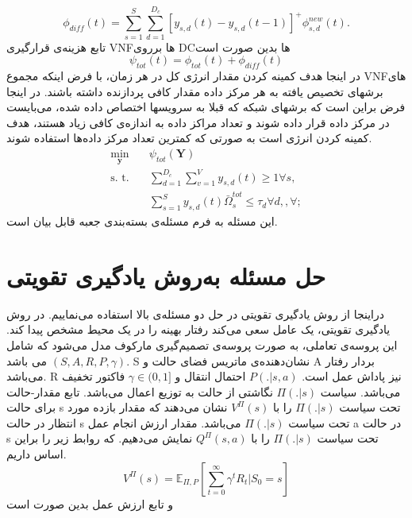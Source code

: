 \begin{equation*}
	\textstyle \phi_{diff}(t) = \sum_{s=1}^{S}\sum_{d=1}^{D_c}[y_{s,d}(t)-y_{s,d}(t-1)]^+\phi_{s,d}^{new}(t).
\end{equation*}
تابع هزینه‌ی قرارگیری VNFها برروی DCها بدین صورت است
\begin{equation}\label{eqpsi}
	\textstyle  \psi_{tot}(t) = \phi_{tot}(t) + \phi_{diff}(t)
\end{equation}
در اینجا هدف کمینه کردن مقدار انرژی کل در هر زمان، با فرض اینکه مجموع VNFهای برشهای تخصیص یافته به هر مرکز داده مقدار کافی پردازنده داشته باشند. در اینجا فرض براین است که برشهای شبکه که قبلا به سرویسها اختصاص داده شده، می‌بایست در مرکز داده قرار داده شوند و تعداد مراکز داده به اندازه‌ی کافی زیاد هستند، هدف کمینه کردن انرژی است به صورتی که کمترین تعداد مرکز داده‌ها استفاده شوند.
\begin{subequations}
	\begin{alignat}{4}
		\min\limits_{\boldsymbol{y} }   \quad &   \psi_{tot}(\boldsymbol{Y})\\
		\text{s. t.} \quad & \textstyle \sum_{d=1}^{D_c}\sum_{v=1}^{V}y_{s,d}(t) \geq 1 \forall s, \\
		&\textstyle  \sum_{s=1}^{S} y_{s,d}(t) \bar{\Omega}_{s}^{tot}  \leq   \tau_{d}  \forall d,, \forall ;  \label{eqomega}
	\end{alignat}
\end{subequations}
این مسئله به فرم مسئله‌ی بسته‌بندی جعبه قابل بیان است.
\section{حل مسئله به‌روش یادگیری تقویتی}
دراینجا از روش یادگیری تقویتی در حل دو مسئله‌ی بالا استفاده می‌نماییم.
در روش یادگیری تقویتی، یک عامل سعی می‌کند رفتار بهینه را در یک محیط مشخص پیدا کند. این پروسه‌ی تعاملی، به صورت پروسه‌ی تصمیم‌گیری مارکوف مدل می‌شود که شامل $(S,A,R,P,\gamma)$  می باشد.
S
نشان‌دهنده‌ی ماتریس فضای حالت و A بردار رفتار می‌باشد. R نیز پاداش عمل است. 
$P(.|s,a)$
احتمال انتقال و
 $\gamma \in (0,1]$
 فاکتور تخفیف می‌باشد.
 سیاست 
$\Pi(.|s)$
نگاشتی از حالت به توزیع اعمال می‌باشد.
تابع مقدار-حالت برای حالت s تحت سیاست $\Pi(.|s)$ را با  
$V^{\Pi}(s)$
نشان می‌دهند که مقدار بازده مورد انتظار در حالت s تحت سیاست $\Pi(.|s)$
می‌باشد. مقدار ارزش انجام عمل a در حالت s تحت سیاست $\Pi(.|s)$ 
را با
 $Q^{\Pi}(s,a)$
 نمایش می‌دهیم.
 که روابط زیر را براین اساس داریم.
 \begin{equation}
	V^{\Pi}(s) = \mathbb{E}_{\Pi,P}[\sum_{t=0}^{\infty}\gamma^tR_t|S_0=s]
 \end{equation}
و تابع ارزش عمل بدین صورت است

